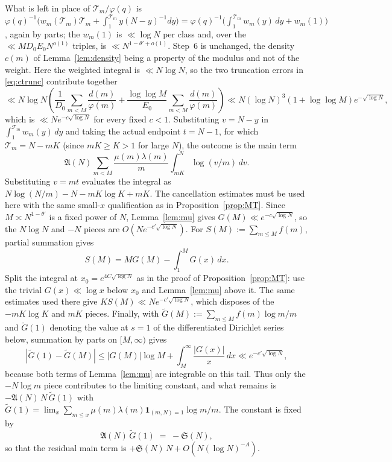 \documentclass[11pt,a4paper]{article}
\theoremstyle{plain}
\theoremstyle{definition}
\theoremstyle{remark}
\renewcommand{\SS}{\mathfrak{S}}
\newcommand{\AAA}{\mathfrak{A}}
\newcommand{\Tcut}{\mathcal T}
\begin{document}
What is left in place of $\Tcut_m/\varphi(q)$ is
$\varphi(q)^{-1}\bigl(w_m(\Tcut_m)\Tcut_m+\int_1^{\Tcut_m}y(N-y)^{-1}dy
\bigr)=\varphi(q)^{-1}\bigl(\int_1^{\Tcut_m}w_m(y)\,dy+w_m(1)\bigr)$,
again by parts; the $w_m(1)$ is $\ll\log N$ per class and, over the
$\ll MD_0E_0N^{o(1)}$ triples, is $\ll N^{1-\theta'+o(1)}$. Step~6 is
unchanged, the density $c(m)$ of Lemma~\ref{lem:density} being a
property of the modulus and not of the weight.  Here the weighted
integral is $\ll N\log N$, so the two truncation errors in
\eqref{eq:ctrunc} contribute together
\[
  \ll N\log N\left(
       \frac{1}{D_0}\sum_{m<M}\frac{d(m)}{\varphi(m)}
       +\frac{\log\log M}{E_0}\sum_{m<M}\frac{d(m)}{\varphi(m)}
       \right)
  \ll N(\log N)^3(1+\log\log M)e^{-\sqrt{\log N}},
\]
which is $\ll Ne^{-c\sqrt{\log N}}$ for every fixed $c<1$.
Substituting $v=N-y$ in
$\int_1^{\Tcut_m}w_m(y)\,dy$ and taking the actual endpoint
$t=N-1$, for which $\Tcut_m=N-mK$ (since $mK\ge K>1$ for large
$N$), the outcome is the main term
\[
  \AAA(N)\sum_{m<M}\frac{\mu(m)\lambda(m)}{m}
  \int_{mK}^{N}\log(v/m)\,dv.
\]
Substituting $v=mt$ evaluates the integral as
$N\log(N/m)-N-mK\log K+mK$.  The cancellation estimates must be
used here with the same small-$x$ qualification as in
Proposition~\ref{prop:MT}.  Since $M\asymp N^{1-\theta'}$ is a fixed
power of $N$, Lemma~\ref{lem:mu} gives
$G(M)\ll e^{-c\sqrt{\log N}}$, so the $N\log N$ and $-N$ pieces are
$O(Ne^{-c'\sqrt{\log N}})$.  For
$S(M):=\sum_{m\le M}f(m)$, partial summation gives
\[
  S(M)=M G(M)-\int_1^M G(x)\,dx .
\]
Split the integral at $x_0=e^{4C\sqrt{\log N}}$ as in the proof of
Proposition~\ref{prop:MT}: use the trivial $G(x)\ll\log x$ below
$x_0$ and Lemma~\ref{lem:mu} above it.  The same estimates used there
give $K S(M)\ll Ne^{-c'\sqrt{\log N}}$, which disposes of the
$-mK\log K$ and $mK$ pieces.  Finally, with
$\widetilde G(M):=\sum_{m\le M}f(m)\log m/m$ and
$\widetilde G(1)$ denoting the value at $s=1$ of the differentiated
Dirichlet series below, summation by parts on $[M,\infty)$ gives
\[
 |\widetilde G(1)-\widetilde G(M)|
 \le |G(M)|\log M+\int_M^\infty\frac{|G(x)|}{x}\,dx
 \ll e^{-c'\sqrt{\log N}},
\]
because both terms of Lemma~\ref{lem:mu} are integrable on this tail.
Thus only the $-N\log m$ piece contributes to the limiting constant,
and what remains is $-\AAA(N)\,N\,\widetilde G(1)$ with
$\widetilde G(1)=\lim_x\sum_{m\le x}\mu(m)\lambda(m)
\mathbf 1_{(m,N)=1}\log m/m$. The constant is fixed by
\begin{equation}\label{eq:Gtilde}
  \AAA(N)\,\widetilde G(1)\;=\;-\SS(N),
\end{equation}
so that the residual main term is $+\SS(N)\,N+O(N(\log N)^{-A})$.
\end{document}
